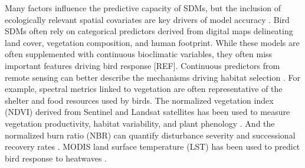 \documentclass[manuscript, 3p,
authoryear]{elsarticle} %
\begin{document}
Many factors influence the predictive capacity of SDMs, but the
inclusion of ecologically relevant spatial covariates are key drivers of
model accuracy
\citep{Franklin1995, Vaughn2003, fourcadePaintingsPredictDistribution2018}.
Bird SDMs often rely on categorical predictors derived from digital maps
delineating land cover, vegetation composition, and human footprint.
While these models are often supplemented with continuous bioclimatic
variables, they often miss important features driving bird response
{[}REF{]}. Continuous predictors from remote sensing can better describe
the mechanisms driving habitat selection
\citep{heWillRemoteSensing2015}. For example, spectral metrics linked to
vegetation are often representative of the shelter and food resources
used by birds. The normalized vegetation index (NDVI) derived from
Sentinel and Landsat satellites has been used to measure vegetation
productivity, habitat variability, and plant phenology
\citep{pettorelliNormalizedDifferenceVegetation2011}. And the normalized
burn ratio (NBR) can quantify disturbance severity and successional
recovery rates \citep{hislopUsingLandsatSpectral2018}. MODIS land
surface temperature (LST) has been used to predict bird response to
heatwaves \citep{albrightHeatWavesMeasured2011}.
\end{document}
